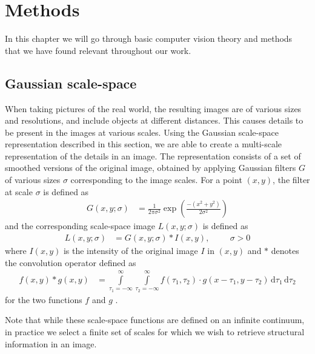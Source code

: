 \documentclass[thesis.tex]{subfiles}
\begin{document}
\chapter{Methods}
In this chapter we will go through basic computer vision theory and methods that we have found relevant throughout our work.

\section{Gaussian scale-space}
\label{sec:GaussianScaleSpace}
%
When taking pictures of the real world, the resulting images are of various sizes and resolutions, and include objects at different distances. This causes details to be present in the images at various scales. Using the Gaussian scale-space representation \cite{griffin1997scale,ginneken2000applications} described in this section, we are able to create a multi-scale representation of the details in an image. The representation consists of a set of smoothed versions of the original image, obtained by applying Gaussian filters $G$ of various sizes $\sigma$ corresponding to the image scales. For a point $(x,y)$, the filter at scale $\sigma$ is defined as
%
\begin{align}
	G(x,y;\sigma) &= \frac{1}{2\pi \sigma^2} \exp \left(\frac{-(x^2+y^2)}{2\sigma^2} \right)
\end{align}
%
and the corresponding scale-space image $L(x,y;\sigma)$ is defined as
%
\begin{align}
	L(x,y;\sigma) &= G(x,y;\sigma) \ast I(x,y),\hspace{1cm}\sigma > 0
\end{align}
%
where $I(x,y)$ is the intensity of the original image $I$ in $(x,y)$ and $\ast$ denotes the convolution operator defined as
\begin{align*}
	f(x,y) \ast g(x,y) &= \int\limits_{\tau_1 = -\infty}^\infty \int\limits_{\tau_2 = -\infty}^\infty f(\tau_1,\tau_2) \cdot g(x-\tau_1,y-\tau_2)\,\text{d}\tau_1\,\text{d}\tau_2
\end{align*}
for the two functions $f$ and $g$ \cite[p.~345]{gonzalez:2008:digital}.

Note that while these scale-space functions are defined on an infinite continuum, in practice we select a finite set of scales for which we wish to retrieve structural information in an image.
\end{document}
